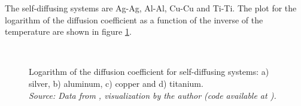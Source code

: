 The self-diffusing systems are Ag-Ag, Al-Al, Cu-Cu and Ti-Ti. The plot for the logarithm of the diffusion coefficient as a function of the inverse of the temperature are shown in figure \ref{fig:selfdiff_lnd}.  
\begin{figure}[h]
 \centering
 \captionsetup{justification=centering,margin=2cm}
   \\
 \caption{Logarithm of the diffusion coefficient for self-diffusing systems: a) silver, b) aluminum, c) copper and d) titanium.\\ 
 \textit{Source: Data from \citep{kakusan}, visualization by the author (code available at \citep{mygit}).}}
 \label{fig:selfdiff_lnd}
\end{figure}

